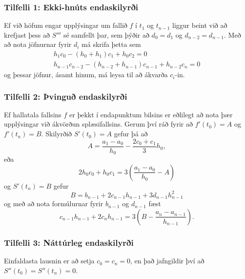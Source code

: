 \documentclass[icelandic,a4paper,12pt]{article}
\begin{document}
\subsubsection{Tilfelli 1: Ekki-hnúts endaskilyrði} 
Ef við höfum engar upplýsingar um fallið $f$ í $t_1$ og $t_{n-1}$
liggur beint við að krefjast þess að $S'''$ sé samfellt þar, sem þýðir
að $d_0 = d_1$ og $d_{n-2} = d_{n-1}$. Með að nota jöfnurnar fyrir
$d_i$ má skrifa þetta sem 
\begin{align*}
	h_1c_0 - (h_0 + h_1)c_1 + h_0c_2 = 0 \\
	h_{n-1}c_{n-2}-(h_{n-2}+h_{n-1})c_{n-1}+h_{n-2}c_n = 0
\end{align*}
og þessar jöfnur, ásamt hinum, má leysa til að ákvarða $c_i$-in.


\subsubsection{Tilfelli 2: Þvinguð endaskilyrði} 
Ef hallatala fallsins $f$ er þekkt í endapunktum bilsins er eðlilegt að nota þær upplýsingar við ákvörðun splæsifallsins. Gerum því ráð fyrir að $f'(t_0) = A$ og $f'(t_n) = B$. Skilyrðið $S'(t_0) = A$ gefur þá að
\begin{equation*}
	A = \frac{a_1-a_0}{h_0} - \frac{2c_0+c_1}{3}h_0,
\end{equation*} 
eða
\begin{equation*}
	2h_0c_0 + h_0c_1 = 
	3 \left( \frac{a_1-a_0}{h_0} - A \right)
\end{equation*}
og $S'(t_n) = B$ gefur
\begin{equation*}
	B = b_{n-1} + 2c_{n-1}h_{n-1} + 3d_{n-1}h_{n-1}^2
\end{equation*}
og með að nota formúlurnar fyrir $b_{n-1}$ og $d_{n-1}$ fæst
\begin{equation*}
	c_{n-1}h_{n-1} + 2c_nh_{n-1} = 
	3 \left( B  - \frac{a_n-a_{n-1}}{h_{n-1}} \right).
\end{equation*}


\subsubsection{Tilfelli 3:  Náttúrleg endaskilyrði} 
Einfaldasta lausnin er að setja $c_0 = c_n = 0$, en það 
jafngildir því að $S''(t_0) = S''(t_n) = 0$.


\end{document}
